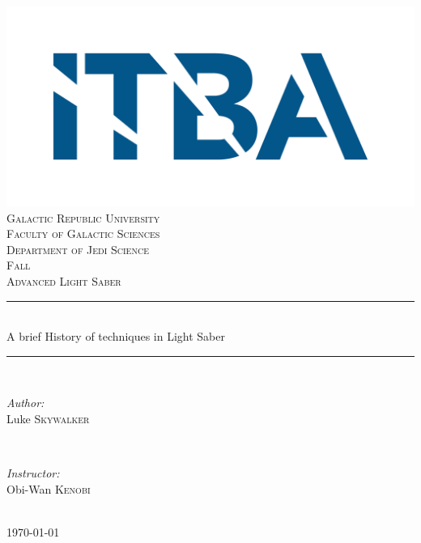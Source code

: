 \begin{titlepage}

\newcommand{\HRule}{\rule{\linewidth}{0.5mm}} %
\center %

\includegraphics[scale=0.25, keepaspectratio]{logo.jpg}\\[0.5cm] %

\textsc{\LARGE Galactic Republic University}\\[0.5cm] %
\textsc{\Large Faculty of Galactic Sciences}\\[0.5cm] %
\textsc{\Large Department of Jedi Science}\\[0.5cm] %
\textsc{\Large Fall}\\[0.3cm] %
\textsc{\large Advanced Light Saber}\\[2.5cm] %

\HRule \\[0.4cm]
{\LARGE  A brief History of techniques in Light Saber}\\[0.2cm] %
\HRule \\[0.4cm]

\begin{minipage}{0.4\textwidth}
\begin{flushleft} \large
\emph{Author:}\\
Luke \textsc{Skywalker} %
\end{flushleft}
\end{minipage}
~
\begin{minipage}{0.4\textwidth}
\begin{flushright} \large
\emph{Instructor:} \\
Obi-Wan \textsc{Kenobi} %
\end{flushright}
\end{minipage}\\[6cm]

{\large \today}\\[3cm] %
 
\vfill %

\end{titlepage}

